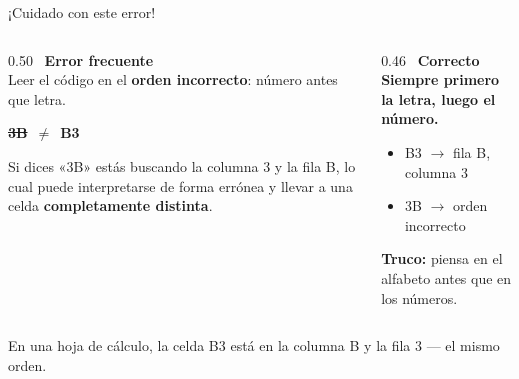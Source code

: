 \documentclass[aspectratio=169, 10pt, spanish]{beamer}
\begin{document}
\begin{frame}{¡Cuidado con este error!}
  \begin{errorbox}
    \begin{columns}[c]
      \begin{column}{0.50\textwidth}
        \incorrecto\ \textbf{Error frecuente}\\[6pt]
        Leer el código en el \textbf{orden incorrecto}:
        número antes que letra.\\[8pt]
        \begin{center}
          \AlmFontLarge
          \textbf{\sout{3B}}~$\neq$~\textbf{B3}
        \end{center}
        \vspace{4pt}
        \AlmFontFootnote
        Si dices «3B» estás buscando la columna 3
        y la fila B, lo cual puede interpretarse
        de forma errónea y llevar a una celda
        \textbf{completamente distinta}.
      \end{column}
      \begin{column}{0.46\textwidth}
        \correcto\ \textbf{Correcto}\\[6pt]
        \textbf{Siempre primero la letra, luego el número.}\\[8pt]
        \begin{itemize}
          \item B3 $\rightarrow$ fila B, columna 3 \correcto
          \item 3B $\rightarrow$ orden incorrecto \incorrecto
        \end{itemize}
        \vspace{6pt}
        \AlmFontFootnote
        \textbf{Truco:} piensa en el alfabeto antes que en los números.
      \end{column}
    \end{columns}
  \end{errorbox}
  \vspace{6pt}
  \begin{notabox}[Analogía]
    \AlmFontSmall
    En una hoja de cálculo, la celda B3 está
    en la columna B y la fila 3 — el mismo orden.
  \end{notabox}
\end{frame}
\end{document}
